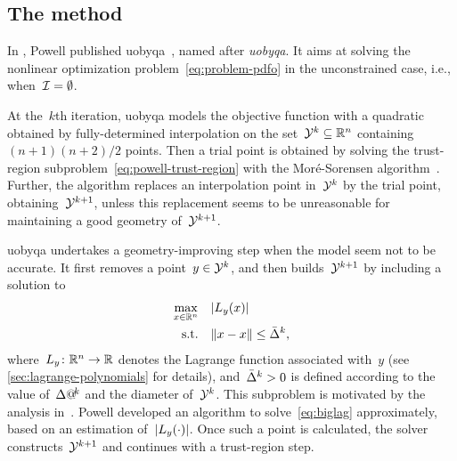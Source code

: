 \subsection{The  method}
\label{subsec:uobyqa}

In , Powell published \gls{uobyqa}~\cite{Powell_2002}, named after \emph{\glsdesc{uobyqa}}.
It aims at solving the nonlinear optimization problem~\cref{eq:problem-pdfo} in the unconstrained case, i.e., when~$\mathcal{I} = \emptyset$.

At the~$k$th iteration, \gls{uobyqa} models the objective function with a quadratic obtained by fully-determined interpolation on the set~$\xpt[k] \subseteq \R^n$ containing~$(n + 1)(n + 2) / 2$ points.
Then a trial point is obtained by solving the trust-region subproblem~\cref{eq:powell-trust-region} with the Mor{\'{e}}-Sorensen algorithm~\cite{More_Sorensen_1983}.
Further, the algorithm replaces an interpolation point in~$\xpt[k]$ by the trial point, obtaining~$\xpt[k + 1]$, unless this replacement seems to be unreasonable for maintaining a good geometry of~$\xpt[k + 1]$.

\Gls{uobyqa} undertakes a geometry-improving step when the model seem not to be accurate.
It first removes a point~$y \in \xpt[k]$, and then builds~$\xpt[k + 1]$ by including a solution to
\begin{subequations}
    \label{eq:biglag}
    \begin{align}
        \max_{x \in \R^n}   & \quad \abs{\lagp[y](x)}\\
        \text{s.t.}         & \quad \norm{x - \iter} \le \bar{\rad}^k, \label{eq:biglag-tr}
    \end{align}
\end{subequations}
where~$\lagp[y] \colon \R^n \to \R$ denotes the Lagrange function associated with~$y$ (see \cref{sec:lagrange-polynomials} for details), and~$\bar{\rad}^k > 0$ is defined according to the value of~$\rad[k]$ and the diameter of~$\xpt[k]$.
This subproblem is motivated by the analysis in~\cite[\S~2]{Powell_2001}.
Powell developed an algorithm to solve~\cref{eq:biglag} approximately, based on an estimation of~$\abs{\lagp[y](\cdot)}$.
Once such a point is calculated, the solver constructs~$\xpt[k + 1]$ and continues with a trust-region step.

